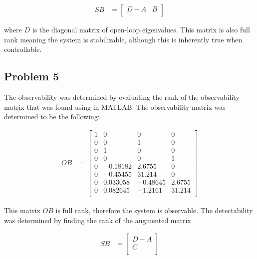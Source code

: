 \documentclass[12pt, letterpaper, onecolumn]{article}
\begin{document}
\begin{equation*}
    \begin{split}
        SB & =
        \begin{bmatrix}
            D-A & B \\
        \end{bmatrix}
    \end{split}
\end{equation*}

where $D$ is the diagonal matrix of open-loop eigenvalues. This matrix is also full rank meaning the system is stabilizable, although this is inherently true when controllable.

\subsection*{Problem 5}
The observability was determined by evaluating the rank of the observability matrix that was found using  in MATLAB\@. The observability matrix was determined to be the following:


\begin{equation*}
    \begin{split}
        OB & =
        \begin{bmatrix}
            1 & 0        & 0        & 0      \\
            0 & 0        & 1        & 0      \\
            0 & 1        & 0        & 0      \\
            0 & 0        & 0        & 1      \\
            0 & -0.18182 & 2.6755   & 0      \\
            0 & -0.45455 & 31.214   & 0      \\
            0 & 0.033058 & -0.48645 & 2.6755 \\
            0 & 0.082645 & -1.2161  & 31.214 \\
        \end{bmatrix}
    \end{split}
\end{equation*}

This matrix $OB$ is full rank, therefore the system is observable. The detectability was determined by finding the rank of the augmented matrix

\begin{equation*}
    \begin{split}
        SB & =
        \begin{bmatrix}
            D-A \\
            C   \\
        \end{bmatrix}
    \end{split}
\end{equation*}
\end{document}
